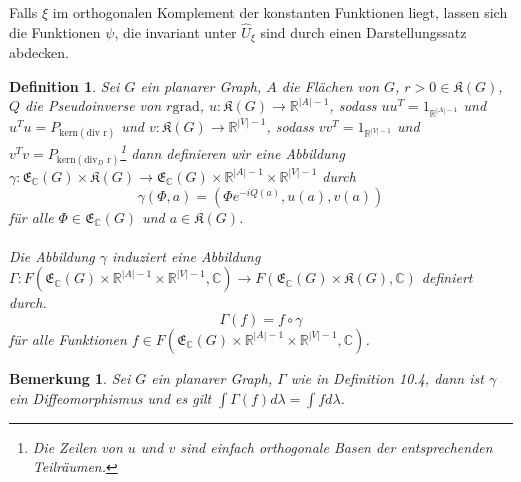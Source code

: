 \documentclass[11pt,a4paper,leqno]{report}
\newtheorem{definition}[theorem]{Definition}
\newtheorem{remark}[theorem]{Bemerkung}
\numberwithin{equation}{chapter}
\begin{document}
\noindent
Falls $\xi$ im orthogonalen Komplement der konstanten Funktionen liegt, lassen sich die Funktionen $\psi$, die invariant unter $\hat{U}_\xi$ sind durch einen Darstellungssatz abdecken.
\begin{definition}
	Sei $G$ ein planarer Graph, $A$ die Fl\"achen von $G$, $r>0\in \mathfrak{K}(G)$, $Q$ die Pseudoinverse von $r\text{grad}$, $u:\mathfrak{K}(G)\rightarrow \mathbb{R}^{|A|-1}$, sodass $uu^T=1_{\mathbb{R}^{|A|-1}}$ und $u^Tu=P_{\text{kern}(\text{div r})}$ und  $v:\mathfrak{K}(G)\rightarrow \mathbb{R}^{|V|-1}$, sodass $vv^T=1_{\mathbb{R}^{|V|-1}}$ und $v^Tv=P_{\text{kern}(\text{div}_D\text{ r})}$\footnote{Die Zeilen von $u$ und $v$ sind einfach orthogonale Basen der entsprechenden Teilr\"aumen.} dann definieren wir eine Abbildung $\gamma:\mathfrak{E}_\mathbb{C}(G)\times\mathfrak{K}(G)\rightarrow  \mathfrak{E}_\mathbb{C}(G)\times\mathbb{R}^{|A|-1}\times\mathbb{R}^{|V|-1}$ durch
	\begin{equation}
		\gamma(\Phi, a) = (\Phi e^{-iQ(a)}, u(a), v(a))
	\end{equation}
f\"ur alle $\Phi\in\mathfrak{E}_\mathbb{C}(G)$ und $a\in\mathfrak{K}(G)$.\\
\\
Die Abbildung $\gamma$ induziert eine Abbildung $\Gamma:F(\mathfrak{E}_\mathbb{C}(G)\times\mathbb{R}^{|A|-1}\times\mathbb{R}^{|V|-1}, \mathbb{C})\rightarrow F(\mathfrak{E}_\mathbb{C}(G)\times\mathfrak{K}(G), \mathbb{C})$ definiert durch.
\begin{equation}
	\Gamma(f)=f\circ\gamma
\end{equation}
f\"ur alle Funktionen $f\in F(\mathfrak{E}_\mathbb{C}(G)\times\mathbb{R}^{|A|-1}\times\mathbb{R}^{|V|-1}, \mathbb{C})$.
\end{definition}
\begin{remark}
	Sei $G$ ein planarer Graph, $\Gamma$ wie in Definition 10.4, dann ist $\gamma$ ein Diffeomorphismus und es gilt $\int \Gamma(f)d\lambda = \int f d\lambda$.
\end{remark}
\end{document}
